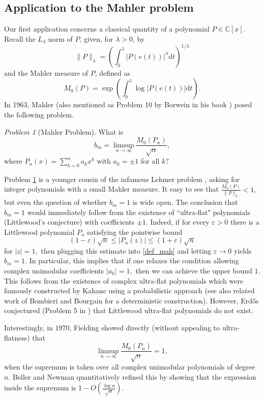 \documentclass[12pt, a4paper]{amsart}
\theoremstyle{remark}
\newtheorem{problem}{Problem}
\newcommand{\ud}{\mathrm{d}}
\begin{document}
\subsection{Application to the Mahler problem}
 Our first application  concerns a classical quantity of a
 polynomial $P\in\mathbb{C}[x].$ Recall the $L_{\lambda}$ norm of $P$,
 given, for $\lambda > 0$, by
 \[
     \|P\|_{\lambda} = \left(\int_0^1 |P(e(t))|^{\lambda} \ud t\right)^{1/\lambda}
 \]
 and the Mahler measure of $P$, defined as
\begin{equation}\label{def_mah}
M_0(P)=\exp\left(\int_{0}^1\log |P(e(t))|\ud t\right).
\end{equation}
In 1963, Mahler \cite{mahler} (also mentioned as Problem 10 by Borwein in his
book \cite{B-book}) posed the following problem.
\begin{problem}[Mahler Problem]\label{mah_question}
What is
\[b_m=\limsup_{n\to\infty} \frac{M_0(P_n)}{\sqrt{n}},\]
where $P_n(x)=\sum_{k=0}^na_kx^k$ with $a_k=\pm 1$ for all $k$?
\end{problem}
Problem \ref{mah_question} is a younger cousin of the infamous Lehmer problem \cite{Lehmer}, asking for integer polynomials with a small Mahler measure.
It easy to see that $\frac{M_0(P)}{\|P\|_2}<1,$ but even the question of whether $b_m=1$ is wide
open. The conclusion that $b_m=1$ would immediately follow from the
existence of ``ultra-flat" polynomials (Littlewood's conjecture) with coefficients $\pm 1.$ Indeed, if for every $\varepsilon>0$ there is a Littlewood polynomial
$P_n$ satisfying the pointwise bound
\[(1-\varepsilon)\sqrt{n}\le |P_n(z)|\le (1+\varepsilon)\sqrt{n}\]
for $|z|=1,$ then plugging this estimate into \eqref{def_mah} and letting
$\varepsilon\to 0$  yields $b_m=1.$ In particular, this implies that if one
relaxes the condition allowing complex unimodular coefficients $|a_k|=1,$ then
we can achieve the upper bound $1.$ This follows from the existence of complex
ultra-flat polynomials which were famously constructed by Kahane \cite{kahane} using a
probabilistic approach (see also related work of Bombieri and Bourgain
\cite{BB} for a deterministic construction). However, Erd\H{o}s conjectured (Problem 5 in \cite{B-book}) that Littlewood
ultra-flat polynomials do not exist. 

Interestingly, in $1970$, Fielding \cite{Field} showed directly (without
appealing to ultra-flatness) that
\[
    \limsup_{n\to\infty} \frac{M_0(P_n)}{\sqrt{n}}=1,
\]
when the supremum is taken over all complex unimodular polynomials of degree $n.$ Beller and Newman \cite{beller-newman} quantitatively refined this by
showing that the expression inside the supremum is $1-O(\frac{\log n}{\sqrt{n}}).$
\end{document}
